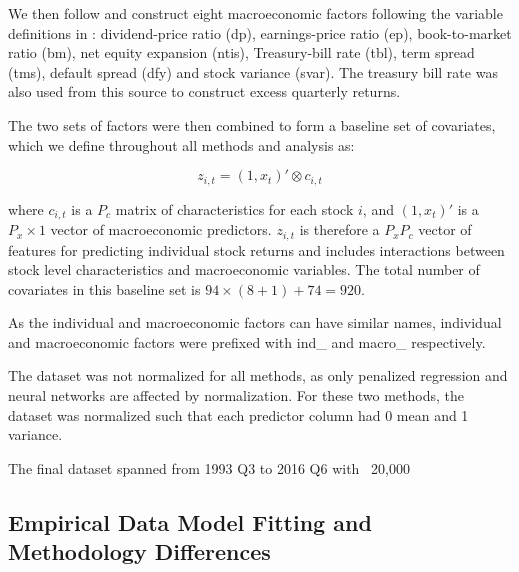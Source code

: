\documentclass[a4paper, table]{article}
\begin{document}

We then follow \cite{gu_empirical_2018} and construct eight macroeconomic factors following the variable definitions in \cite{welch_comprehensive_2008}: dividend-price ratio (dp), earnings-price ratio (ep), book-to-market ratio (bm), net equity expansion (ntis), Treasury-bill rate (tbl), term spread (tms), default spread (dfy) and stock variance (svar). The treasury bill rate was also used from this source to construct excess quarterly returns. 

The two sets of factors were then combined to form a baseline set of covariates, which we define throughout all methods and analysis as:

\begin{equation}
z_{i,t} = (1, x_t)' \otimes c_{i, t}
\end{equation}

where $c_{i,t}$ is a $P_c$ matrix of characteristics for each stock $i$, and $(1, x_t)'$ is a $P_x \times 1$ vector of macroeconomic predictors. $z_{i,t}$ is therefore a $P_x P_c$ vector of features for predicting individual stock returns and includes interactions between stock level characteristics and macroeconomic variables. The total number of covariates in this baseline set is $94 \times (8 + 1) + 74 = 920$.
 
As the individual and macroeconomic factors can have similar names, individual and macroeconomic factors were prefixed with ind\_ and macro\_ respectively.




The dataset was not normalized for all methods, as only penalized regression and neural networks are affected by normalization. For these two methods, the dataset was normalized such that each predictor column had 0 mean and 1 variance.

The final dataset spanned from 1993 Q3 to 2016 Q6 with ~20,000

\subsection{Empirical Data Model Fitting and Methodology Differences}
\end{document}
